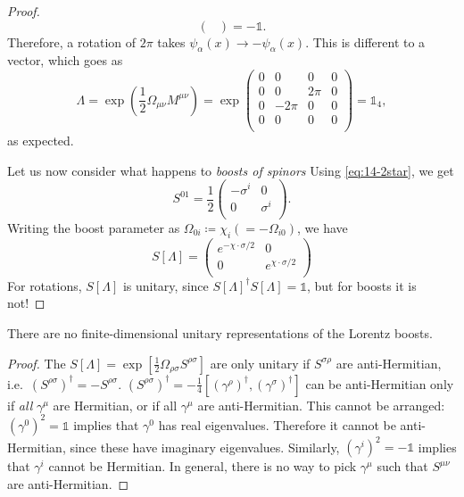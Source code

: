 \begin{proof}
\begin{equation}
\begin{pmatrix}
    \end{pmatrix}
    = -\mathbb{1}.
  \end{equation}
  Therefore, a rotation of $2\pi$ takes $\psi_\alpha(x) \to -\psi_{\alpha}(x)$. This is different to a vector, which goes as 
  \begin{equation}
    \Lambda = \exp(\frac{1}{2} \Omega_{\mu\nu} M^{\mu\nu}) = \exp
    \begin{pmatrix}
     0 & 0 & 0 & 0 \\
     0 & 0 & 2\pi & 0 \\
     0 & -2\pi & 0 & 0 \\
     0 & 0 & 0 & 0 \\
    \end{pmatrix} = \mathbb{1}_4,
  \end{equation}
  as expected.

  Let us now consider what happens to \emph{boosts of spinors}
  Using \eqref{eq:14-2star}, we get
  \begin{equation}
    S^{01} = \frac{1}{2} 
    \begin{pmatrix}
     -\sigma^i & 0 \\
     0 & \sigma^i \\
    \end{pmatrix}.
  \end{equation}
  Writing the boost parameter as $\Omega_{0i} \coloneqq \chi_i (=- \Omega_{i0})$, we have
  \begin{equation}
    S[\Lambda] = 
    \begin{pmatrix}
     e^{-\chi \cdot \sigma / 2} & 0 \\
     0 & e^{\chi \cdot \sigma/2} \\
    \end{pmatrix}
  \end{equation}
  For rotations, $S[\Lambda]$ is unitary, since $S[\Lambda]^{\dagger} S[\Lambda] = \mathbb{1}$, but for boosts it is not!
\end{proof}
\begin{claim}
  There are no finite-dimensional unitary representations of the Lorentz boosts.
\end{claim}
\begin{proof}
  The $S[\Lambda] = \exp[\frac{1}{2} \Omega_{\rho\sigma} S^{\rho\sigma}]$ are only unitary if $S^{\sigma\rho}$ are anti-Hermitian, i.e.~$(S^{\rho\sigma})^{\dagger} = -S^{\rho\sigma}$. $(S^{\rho\sigma})^{\dagger} = -\frac{1}{4} [(\gamma^{\rho})^{\dagger}, (\gamma^{\sigma})^{\dagger}]$ can be anti-Hermitian only if \emph{all} $\gamma^{\mu}$ are Hermitian, or if all $\gamma^{\mu}$ are anti-Hermitian.
  This cannot be arranged: $(\gamma^0)^2 = \mathbb{1}$ implies that $\gamma^0$ has real eigenvalues. Therefore it cannot be anti-Hermitian, since these have imaginary eigenvalues.
  Similarly, $(\gamma^i)^2 = -\mathbb{1}$ implies that $\gamma^i$ cannot be Hermitian.
  In general, there is no way to pick $\gamma^{\mu}$ such that $S^{\mu\nu}$ are anti-Hermitian.
\end{proof}

